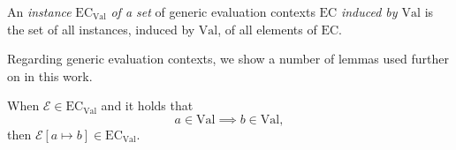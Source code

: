 \begin{definition}
An \textit{instance} $\textrm{EC}_{\textrm{Val}}$ \textit{of a set} of generic evaluation contexts $\textrm{EC}$ \textit{induced by $\textrm{Val}$} is the set of all instances, induced by $\textrm{Val}$, of all elements of $\textrm{EC}$.
\end{definition}

Regarding generic evaluation contexts, we show a number of lemmas used further on in this work.

\begin{lemma}
When $\mathcal{E} \in \textrm{EC}_{\textrm{Val}}$ and it holds that
\[
a \in \textrm{Val} \implies b \in \textrm{Val},
\]
then $\mathcal{E}[a \mapsto b] \in \textrm{EC}_{\textrm{Val}}$.
\end{lemma}
